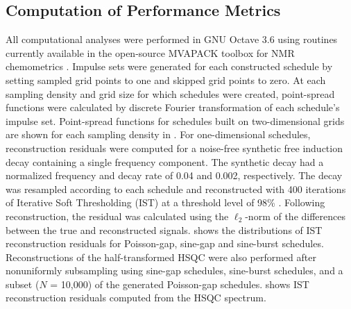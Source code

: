 \subsection{Computation of Performance Metrics}

\begin{doublespace}
All computational analyses were performed in GNU Octave 3.6 \cite{eaton2008}
using routines currently available in the open-source MVAPACK toolbox for
NMR chemometrics \cite{worley:acscb2014}. Impulse sets were generated for
each constructed schedule by setting sampled grid points to one and skipped
grid points to zero. At each sampling density and grid size for which schedules
were created, point-spread functions were calculated by discrete Fourier
transformation of each schedule's impulse set. Point-spread functions for
schedules built on two-dimensional grids are shown for each sampling density
in . For one-dimensional schedules, reconstruction
residuals were computed for a noise-free synthetic free induction decay
containing a single frequency component. The synthetic decay had a normalized
frequency and decay rate of 0.04 and 0.002, respectively. The decay was
resampled according to each schedule and reconstructed with 400 iterations
of Iterative Soft Thresholding (IST) at a threshold level
of 98\% \cite{hyberts:jbnmr2012}. Following reconstruction, the residual
was calculated using the $\ell_2$-norm of the differences between the
true and reconstructed signals.  shows the
distributions of IST reconstruction residuals for Poisson-gap, sine-gap and
sine-burst schedules. Reconstructions of the half-transformed HSQC were also
performed after nonuniformly subsampling using sine-gap schedules, sine-burst
schedules, and a subset ($N$ = 10,000) of the generated Poisson-gap schedules.
 shows IST reconstruction residuals computed
from the HSQC spectrum.
\end{doublespace}

